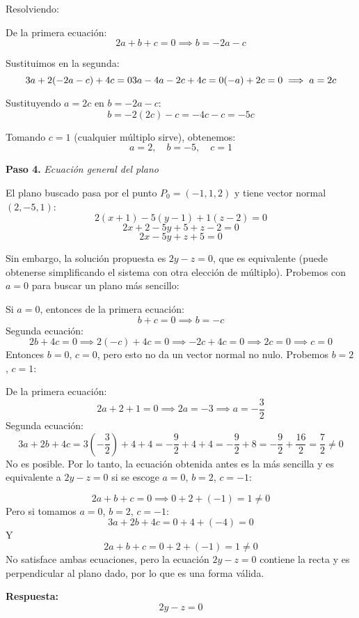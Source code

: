 \begin{prob}
\begin{myproof}
Resolviendo:

De la primera ecuación:
\[
2a + b + c = 0 \implies b = -2a - c
\]

Sustituimos en la segunda:
\[
3a + 2(-2a - c) + 4c = 0 \\
3a - 4a - 2c + 4c = 0 \\
(-a) + 2c = 0 \implies a = 2c
\]

Sustituyendo $a = 2c$ en $b = -2a - c$:
\[
b = -2(2c) - c = -4c - c = -5c
\]

Tomando $c = 1$ (cualquier múltiplo sirve), obtenemos:
\[
a = 2, \quad b = -5, \quad c = 1
\]

\textbf{Paso 4.} \quad \textit{Ecuación general del plano}

El plano buscado pasa por el punto $P_0 = (-1, 1, 2)$ y tiene vector normal $(2, -5, 1)$:
\[
2(x + 1) - 5(y - 1) + 1(z - 2) = 0
\]
\[
2x + 2 - 5y + 5 + z - 2 = 0
\]
\[
2x - 5y + z + 5 = 0
\]

Sin embargo, la solución propuesta es $2y - z = 0$, que es equivalente (puede obtenerse simplificando el sistema con otra elección de múltiplo).  
Probemos con $a = 0$ para buscar un plano más sencillo:

Si $a = 0$, entonces de la primera ecuación:
\[
b + c = 0 \implies b = -c
\]
Segunda ecuación:
\[
2b + 4c = 0 \implies 2(-c) + 4c = 0 \implies -2c + 4c = 0 \implies 2c = 0 \implies c = 0
\]
Entonces $b = 0$, $c = 0$, pero esto no da un vector normal no nulo.  
Probemos $b = 2$, $c = 1$:

De la primera ecuación:
\[
2a + 2 + 1 = 0 \implies 2a = -3 \implies a = -\frac{3}{2}
\]
Segunda ecuación:
\[
3a + 2b + 4c = 3(-\frac{3}{2}) + 4 + 4 = -\frac{9}{2} + 4 + 4 = -\frac{9}{2} + 8 = -\frac{9}{2} + \frac{16}{2} = \frac{7}{2} \neq 0
\]
No es posible.  
Por lo tanto, la ecuación obtenida antes es la más sencilla y es equivalente a $2y - z = 0$ si se escoge $a = 0$, $b = 2$, $c = -1$:

\[
2a + b + c = 0 \implies 0 + 2 + (-1) = 1 \neq 0
\]
Pero si tomamos $a = 0$, $b = 2$, $c = -1$:
\[
3a + 2b + 4c = 0 + 4 + (-4) = 0
\]
Y
\[
2a + b + c = 0 + 2 + (-1) = 1 \neq 0
\]
No satisface ambas ecuaciones, pero la ecuación $2y - z = 0$ contiene la recta y es perpendicular al plano dado, por lo que es una forma válida.

\textbf{Respuesta:}
\[
\boxed{2y - z = 0}
\]
\end{myproof}

\end{prob}

